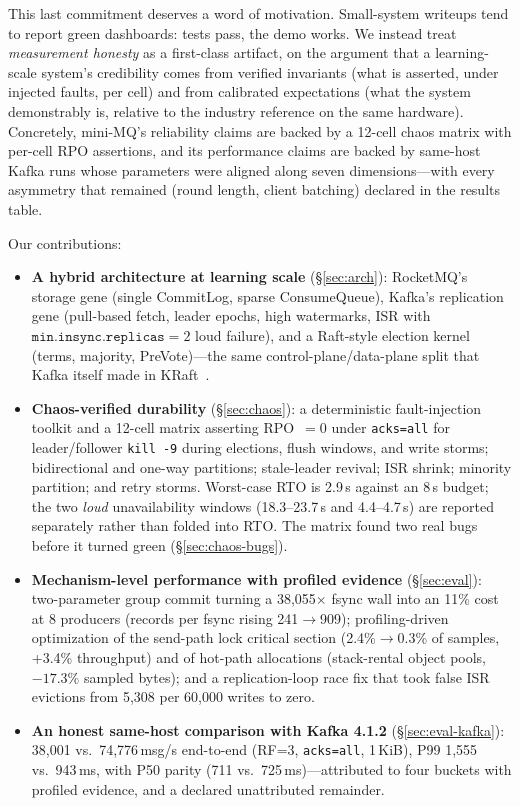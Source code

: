 \documentclass[letterpaper,twocolumn,10pt]{article}
\begin{document}
\noindent
This last commitment deserves a word of motivation. Small-system writeups
tend to report green dashboards: tests pass, the demo works. We instead
treat \emph{measurement honesty} as a first-class artifact, on the argument
that a learning-scale system's credibility comes from verified invariants
(what is asserted, under injected faults, per cell) and from calibrated
expectations (what the system demonstrably is, relative to the industry
reference on the same hardware). Concretely, mini-MQ's reliability claims
are backed by a 12-cell chaos matrix with per-cell RPO assertions, and its
performance claims are backed by same-host Kafka runs whose parameters were
aligned along seven dimensions---with every asymmetry that remained (round
length, client batching) declared in the results table.

Our contributions:

\begin{itemize}
\item \textbf{A hybrid architecture at learning scale}
  (\S\ref{sec:arch}): RocketMQ's storage gene (single CommitLog, sparse
  ConsumeQueue), Kafka's replication gene (pull-based fetch, leader epochs,
  high watermarks, ISR with $\mathtt{min.insync.replicas}=2$ loud failure),
  and a Raft-style election kernel (terms, majority, PreVote)---the same
  control-plane/data-plane split that Kafka itself made in
  KRaft~\cite{kip500}.
\item \textbf{Chaos-verified durability} (\S\ref{sec:chaos}): a
  deterministic fault-injection toolkit and a 12-cell matrix asserting
  RPO~$=0$ under \texttt{acks=all} for leader/follower \texttt{kill -9}
  during elections, flush windows, and write storms; bidirectional and
  one-way partitions; stale-leader revival; ISR shrink; minority partition;
  and retry storms. Worst-case RTO is 2.9\,s against an 8\,s budget; the
  two \emph{loud} unavailability windows (18.3--23.7\,s and 4.4--4.7\,s)
  are reported separately rather than folded into RTO. The matrix found two
  real bugs before it turned green (\S\ref{sec:chaos-bugs}).
\item \textbf{Mechanism-level performance with profiled evidence}
  (\S\ref{sec:eval}): two-parameter group commit turning a 38{,}055$\times$
  fsync wall into an 11\% cost at 8 producers (records per fsync rising
  241$\rightarrow$909); profiling-driven optimization of the send-path
  lock critical section (2.4\%$\rightarrow$0.3\% of samples, +3.4\%
  throughput) and of hot-path allocations (stack-rental object pools,
  $-17.3\%$ sampled bytes); and a replication-loop race fix that took
  false ISR evictions from 5{,}308 per 60{,}000 writes to zero.
\item \textbf{An honest same-host comparison with Kafka 4.1.2}
  (\S\ref{sec:eval-kafka}): 38{,}001 vs.\ 74{,}776\,msg/s end-to-end
  (RF=3, \texttt{acks=all}, 1\,KiB), P99 1{,}555 vs.\ 943\,ms, with
  P50 parity (711 vs.\ 725\,ms)---attributed to four buckets with
  profiled evidence, and a declared unattributed remainder.
\end{itemize}
\end{document}
